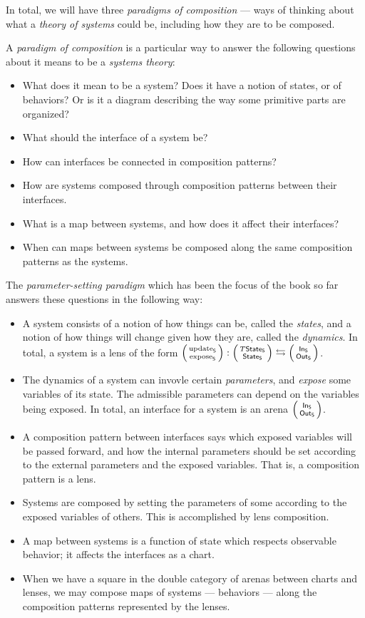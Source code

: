 \documentclass[DynamicalBook]{subfiles}
\begin{document}
In total, we will have three \emph{paradigms of composition} --- ways of thinking about what a \emph{theory of systems} could be, including how they are to be composed.

\begin{informal}\label{informal:paradigm}
 A \emph{paradigm of composition} is a particular way to answer the following questions about it means to be a \emph{systems theory}:
 \begin{itemize}
   \item What does it mean to be a system? Does it have a notion of states, or of behaviors? Or is it a diagram describing the way some primitive parts are organized?
   \item What should the interface of a system be?
   \item How can interfaces be connected in composition patterns?
  \item How are systems composed through composition patterns between their interfaces.
  \item What is a map between systems, and how does it affect their interfaces?
  \item When can maps between systems be composed along the same composition patterns as the systems.
  \end{itemize}
  \end{informal}

The \emph{parameter-setting paradigm} which has been the focus of the book so far answers these questions in the following way:
\begin{itemize}
  \item A system consists of a notion of how things can be, called the \emph{states}, and a notion of how things will change given how they are, called the \emph{dynamics}. In total, a system is a lens of the form $\lens{\update{S}}{\expose{S}} : \lens{T\State{S}}{\State{S}} \fromto \lens{\In{S}}{\Out{S}}$.
  \item The dynamics of a system can invovle certain \emph{parameters}, and \emph{expose} some variables of its state. The admissible parameters can depend on the variables being exposed. In total, an interface for a system is an arena $\lens{\In{S}}{\Out{S}}$.
  \item A composition pattern between interfaces says which exposed variables will be passed forward, and how the internal parameters should be set according to the external parameters and the exposed variables. That is, a composition pattern is a lens.
\item Systems are composed by setting the parameters of some according to the exposed variables of others. This is accomplished by lens composition.
  \item A map between systems is a function of state which respects observable behavior; it affects the interfaces as a chart.
  \item When we have a square in the double category of arenas between charts and lenses, we may compose maps of systems --- behaviors --- along the composition patterns represented by the lenses.
\end{itemize}
\end{document}
